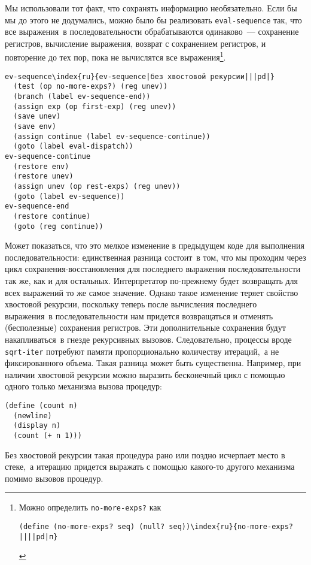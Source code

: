 Мы использовали тот факт, что сохранять информацию
необязательно.  Если бы мы до этого не додумались, можно было бы реализовать
{\tt eval-sequence} так, что все выражения~в последовательности
обрабатываются одинаково~--- сохранение регистров, вычисление
выражения, возврат с сохранением регистров, и повторение до тех пор,
пока не вычислятся все выражения\footnote{Можно определить {\tt no-more-exps?} как
\begin{Verbatim}
(define (no-more-exps? seq) (null? seq))\index{ru}{no-more-exps?||||pd|п}
\end{Verbatim}
}. %

\begin{Verbatim}[fontsize=\small]
ev-sequence\index{ru}{ev-sequence|без хвостовой рекурсии|||pd|}
  (test (op no-more-exps?) (reg unev))
  (branch (label ev-sequence-end))
  (assign exp (op first-exp) (reg unev))
  (save unev)
  (save env)
  (assign continue (label ev-sequence-continue))
  (goto (label eval-dispatch))
ev-sequence-continue
  (restore env)
  (restore unev)
  (assign unev (op rest-exps) (reg unev))
  (goto (label ev-sequence))
ev-sequence-end
  (restore continue)
  (goto (reg continue))
\end{Verbatim}

Может показаться, что это мелкое изменение в
предыдущем коде для выполнения последовательности: единственная
разница состоит~в том, что мы проходим через цикл
сохранения-восстановления для последнего выражения последовательности
так же, как и для остальных.  Интерпретатор по-прежнему будет
возвращать для всех выражений то же самое значение.  Однако такое
изменение теряет свойство хвостовой рекурсии, поскольку теперь после
вычисления последнего выражения~в последовательности нам придется
возвращаться и отменять (бесполезные) сохранения регистров.  Эти
дополнительные сохранения будут накапливаться~в гнезде рекурсивных
вызовов.  Следовательно, процессы вроде {\tt sqrt-iter}
потребуют памяти пропорционально количеству итераций,~а не
фиксированного объема.  
Такая разница может быть существенна.
Например, при наличии хвостовой рекурсии можно выразить бесконечный
цикл с помощью одного только механизма вызова процедур:

\begin{Verbatim}[fontsize=\small]
(define (count n)
  (newline)
  (display n)
  (count (+ n 1)))
\end{Verbatim}
Без хвостовой рекурсии такая процедура рано или поздно исчерпает место
в стеке,~а итерацию придется выражать с помощью какого-то другого механизма
помимо вызовов процедур.

